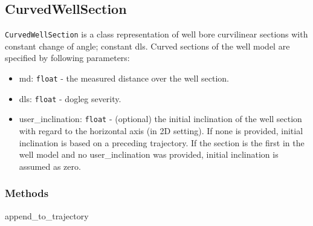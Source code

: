 \documentclass[english,10pt,a4paper]{article}
\begin{document}
	\subsection{CurvedWellSection}
	\texttt{CurvedWellSection} is a class representation of well bore curvilinear sections with constant change of angle; constant dls. Curved sections of the well model are specified by following parameters:
	\begin{itemize}
		\item  \colorbox{gray!20}{md:} \texttt{float} - the measured distance over the well section.
		\item  \colorbox{gray!20}{dls:} \texttt{float} - dogleg severity.
		\item  \colorbox{gray!20}{user\_inclination:} \texttt{float} - (optional) the initial inclination of the well section with regard to the horizontal axis (in 2D setting). If none is provided, initial inclination is based on a preceding trajectory. If the section is the first in the well model and no user\_inclination was provided, initial inclination is assumed as zero.
	\end{itemize}
	\subsubsection{Methods}
	\begin{description}
		\item[\colorbox{gray!20}{append\_to\_trajectory}] \hfill
	\end{description}
\end{document}
